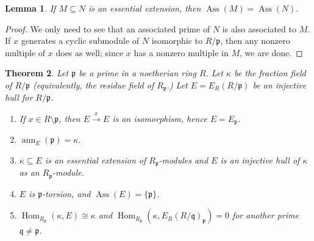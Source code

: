 \documentclass[11pt]{book}
\newtheorem{theorem}{Theorem}[chapter]
\newtheorem{lemma}[theorem]{Lemma}
\numberwithin{equation}{section}
\numberwithin{theorem}{chapter}
\theoremstyle{definition}
\newtheorem*{basic properties}{Basic Properties}
\newtheorem*{Important Remark}{Important Remark}
\theoremstyle{remark}
\newcommand{\p}{\mathfrak{p}}
\newcommand{\q}{\mathfrak{q}}
\newcommand{\Hom}{\operatorname{Hom}}
\newcommand{\Ass}{\operatorname{Ass}}
\newcommand{\ann}{\operatorname{ann}}
\begin{document}
\begin{lemma}
	If $M\subseteq N$ is an essential extension, then $\Ass(M)=\Ass(N)$.
\end{lemma}
\begin{proof}
	We only need to see that an associated prime of $N$ is also associated to $M$. If $x$ generates a cyclic submodule of $N$ isomorphic to $R/\p$, then any nonzero multiple of $x$ does as well; since $x$ has a nonzero multiple in $M$, we are done.
\end{proof}


\begin{theorem}\label{properties-of-ERP}
	Let $\p$ be a prime in a noetherian ring $R$. Let $\kappa$ be the fraction field of $R/\p$ (equivalently, the residue field of $R_\p$.) Let $E=E_R(R/\p)$ be an injective hull for $R/\p$. 
	\begin{enumerate}
		\item If $x\in R\setminus \p$, then $E \stackrel{x}{\to} E$ is an isomorphism, hence $E=E_\p$.
		\item $\ann_E(\p)=\kappa$.
		\item $\kappa\subseteq E$ is an essential extension of $R_\p$-modules and $E$ is an injective hull of $\kappa$ as an $R_{\p}$-module.
		\item $E$ is $\p$-torsion, and $\Ass(E)=\{\p\}$.
		\item $\Hom_{R_\p}(\kappa, E)\cong \kappa$ and $\Hom_{R_\p}(\kappa, E_R(R/\q)_{\p})=0$ for another prime $\q \neq \p$.
	\end{enumerate}
\end{theorem}
\end{document}
